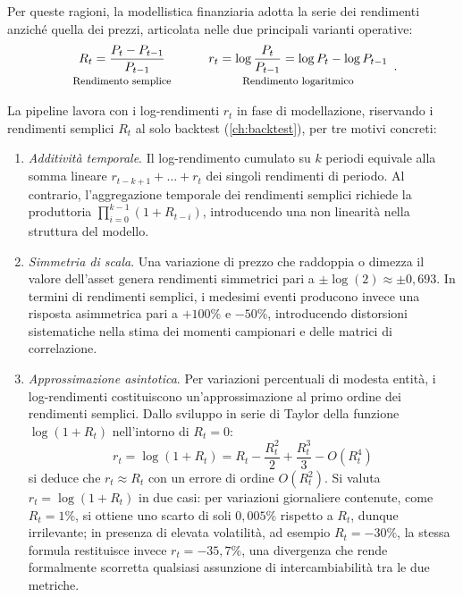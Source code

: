 Per queste ragioni, la modellistica finanziaria adotta la serie dei rendimenti anziché quella dei prezzi, articolata nelle due principali varianti operative:
\begin{equation}
\label{eq:price-returns}
\begin{array}{c}
R_t = \dfrac{P_t - P_{t-1}}{P_{t-1}} \\[4pt]
\text{\footnotesize Rendimento semplice}
\end{array}
\qquad
\begin{array}{c}
r_t = \log\dfrac{P_t}{P_{t-1}} = \log P_t - \log P_{t-1} \\[4pt]
\text{\footnotesize Rendimento logaritmico}
\end{array}.
\end{equation}

La pipeline lavora con i log-rendimenti $r_t$ in fase di modellazione, riservando i rendimenti semplici $R_t$ al solo backtest (\cref{ch:backtest}), per tre motivi concreti:
\begin{enumerate}
\item \emph{Additività temporale}. Il log-rendimento cumulato su $k$ periodi equivale alla somma lineare $r_{t-k+1}+\dots+r_t$ dei singoli rendimenti di periodo. Al contrario, l'aggregazione temporale dei rendimenti semplici richiede la produttoria $\prod_{i=0}^{k-1} (1 + R_{t-i})$, introducendo una non linearità nella struttura del modello.
\item \emph{Simmetria di scala}. Una variazione di prezzo che raddoppia o dimezza il valore dell'asset genera rendimenti simmetrici pari a $\pm\log(2) \approx \pm0{,}693$. In termini di rendimenti semplici, i medesimi eventi producono invece una risposta asimmetrica pari a $+100\%$ e $-50\%$, introducendo distorsioni sistematiche nella stima dei momenti campionari e delle matrici di correlazione.
\item \emph{Approssimazione asintotica}. Per variazioni percentuali di modesta entità, i log-rendimenti costituiscono un'approssimazione al primo ordine dei rendimenti semplici. Dallo sviluppo in serie di Taylor della funzione $\log(1 + R_t)$ nell'intorno di $R_t = 0$:
$$r_t = \log(1 + R_t) = R_t - \frac{R_t^2}{2} + \frac{R_t^3}{3} - O(R_t^4)$$
si deduce che $r_t \approx R_t$ con un errore di ordine $O(R_t^2)$. Si valuta $r_t = \log(1 + R_t)$ in due casi: per variazioni giornaliere contenute, come $R_t = 1\%$, si ottiene uno scarto di soli $0{,}005\%$ rispetto a $R_t$, dunque irrilevante; in presenza di elevata volatilità, ad esempio $R_t = -30\%$, la stessa formula restituisce invece $r_t = -35{,}7\%$, una divergenza che rende formalmente scorretta qualsiasi assunzione di intercambiabilità tra le due metriche.
\end{enumerate}

